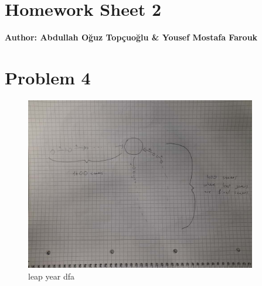 \documentclass{article}
\begin{document}
\section*{\huge Homework Sheet 2}
\begin{flushright}
   \textbf{Author: Abdullah Oğuz Topçuoğlu \& Yousef Mostafa Farouk}
\end{flushright}


\section*{Problem 4}
\begin{figure}[h!]
  \centering
  \includegraphics[width=0.9\textwidth]{4.jpeg}
  \caption{leap year dfa}
\end{figure}
\end{document}
